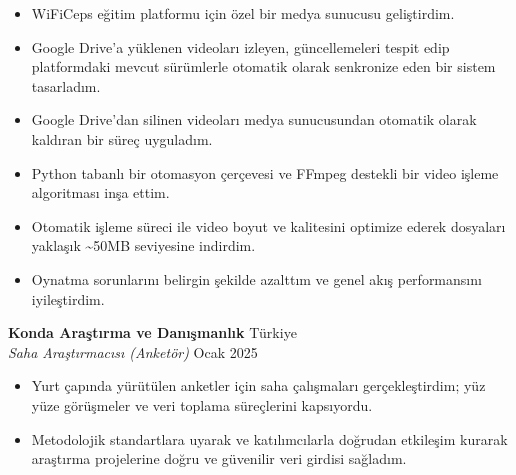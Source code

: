 \documentclass[10pt,a4paper]{extarticle}
\begin{document}
\begin{itemize}[leftmargin=*,noitemsep,topsep=0pt]
    \item WiFiCeps eğitim platformu için özel bir medya sunucusu geliştirdim.
    \item Google Drive'a yüklenen videoları izleyen, güncellemeleri tespit edip platformdaki mevcut sürümlerle otomatik olarak senkronize eden bir sistem tasarladım.
    \item Google Drive'dan silinen videoları medya sunucusundan otomatik olarak kaldıran bir süreç uyguladım.
    \item Python tabanlı bir otomasyon çerçevesi ve FFmpeg destekli bir video işleme algoritması inşa ettim.
    \item Otomatik işleme süreci ile video boyut ve kalitesini optimize ederek dosyaları yaklaşık \textasciitilde50MB seviyesine indirdim.
    \item Oynatma sorunlarını belirgin şekilde azalttım ve genel akış performansını iyileştirdim.
\end{itemize}
\textbf{Konda Araştırma ve Danışmanlık} \hfill Türkiye\\
\textit{Saha Araştırmacısı (Anketör)} \hfill Ocak 2025
\begin{itemize}[leftmargin=*,noitemsep,topsep=0pt]
    \item Yurt çapında yürütülen anketler için saha çalışmaları gerçekleştirdim; yüz yüze görüşmeler ve veri toplama süreçlerini kapsıyordu.
    \item Metodolojik standartlara uyarak ve katılımcılarla doğrudan etkileşim kurarak araştırma projelerine doğru ve güvenilir veri girdisi sağladım.
\end{itemize}
\end{document}
